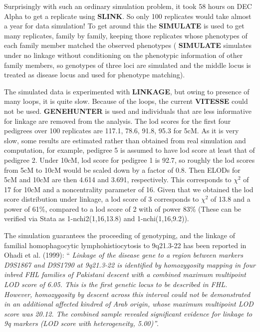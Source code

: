 
Surprisingly with such an ordinary simulation problem, it took 58 hours on DEC
Alpha to get a replicate using {\bf SLINK}.  So only 100 replicates would take
almost a year for data simulation!  To get around this the {\bf SIMULATE} is
used to get many replicates, family by family, keeping those replicates whose
phenotypes of each family member matched the observed phenotypes ({\bf
SIMULATE} simulates under no linkage without conditioning on the phenotypic
information of other family members, so genotypes of three loci are simulated
and the middle locus is treated as disease locus and used for phenotype
matching).

The simulated data is experimented with {\bf LINKAGE}, but owing to presence of
many loops, it is quite slow.  Because of the loops, the current {\bf VITESSE}
could not be used.  {\bf GENEHUNTER} is used and individuals that are less
informative for linkage are removed from the analysis.  The lod scores for the
first four pedigrees over 100 replicates are 117.1, 78.6, 91.8, 95.3 for 5cM.
As it is very slow, some results are estimated rather than obtained from real
simulation and computation, for example, pedigree 5 is assumed to have lod
score at least that of pedigree 2.  Under 10cM, lod score for pedigree 1 is
92.7, so roughly the lod scores from 5cM to 10cM would be scaled down by a
factor of 0.8.  Then ELODs for 5cM and 10cM are then 4.614 and 3.691,
respectively.  This corresponds to $\chi^2$ of 17 for 10cM and a noncentrality
parameter of 16.  Given that we obtained the lod score distribution under
linkage, a lod score of 3 corresponds to $\chi^2$ of 13.8 and a power of 61\%,
compared to a lod score of 2 with of power 83\% (These can be verified via
Stata as 1-nchi2(1,16,13.8) and 1-nchi(1,16,9.2)).

The simulation guarantees the proceeding of genotyping, and the linkage of
familial homophagocytic lymphohistiocytosis to 9q21.3-22 has been reported in
Ohadi et al.  (1999):  `` {\em Linkage of the disease gene to a region between
markers D9S1867 and D9S1790 at 9q21.3-22 is identified by homozygosity mapping
in four inbred FHL families of Pakistani descent with a combined maximum
multipoint LOD score of 6.05.  This is the first genetic locus to be described
in FHL.  However, homozygosity by descent across this interval could not be
demonstrated in an additional affected kindred of Arab origin, whose maximum
multipoint LOD score was 20.12.  The combined sample revealed significant
evidence for linkage to 9q markers (LOD score with heterogeneity, 5.00)''}.

